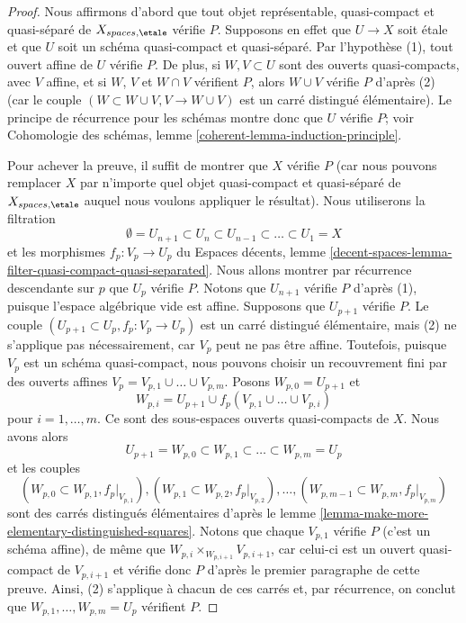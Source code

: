 \begin{proof}
Nous affirmons d'abord que tout objet représentable, quasi-compact et
quasi-séparé de $X_{spaces, \etale}$ v\'erifie $P$.
Supposons en effet que $U \to X$ soit étale et que $U$ soit un schéma
quasi-compact et quasi-séparé. Par l'hypothèse (1), tout ouvert affine de
$U$ v\'erifie $P$. De plus, si $W, V \subset U$ sont des ouverts
quasi-compacts, avec $V$ affine, et si $W$, $V$ et $W \cap V$ v\'erifient
$P$, alors $W \cup V$ v\'erifie $P$ d'après (2)
(car le couple $(W \subset W \cup V, V \to W \cup V)$ est un carré
distingué élémentaire). Le principe de récurrence pour les schémas montre donc
que $U$ v\'erifie $P$; voir
Cohomologie des schémas, lemme \ref{coherent-lemma-induction-principle}.

\medskip\noindent
Pour achever la preuve, il suffit de montrer que $X$ v\'erifie $P$
(car nous pouvons remplacer $X$ par n'importe quel objet quasi-compact et quasi-séparé
de $X_{spaces, \etale}$ auquel nous voulons appliquer le résultat).
Nous utiliserons la filtration
$$
\emptyset = U_{n + 1} \subset
U_n \subset U_{n - 1} \subset \ldots \subset U_1 = X
$$
et les morphismes $f_p : V_p \to U_p$ du
Espaces décents, lemme
\ref{decent-spaces-lemma-filter-quasi-compact-quasi-separated}.
Nous allons montrer par récurrence descendante sur $p$ que $U_p$ v\'erifie
$P$. Notons que $U_{n + 1}$ v\'erifie $P$ d'après (1), puisque l'espace
algébrique vide est affine. Supposons que $U_{p + 1}$ v\'erifie $P$.
Le couple $(U_{p + 1} \subset U_p, f_p : V_p \to U_p)$ est un carré distingué
élémentaire, mais (2) ne s'applique pas nécessairement, car $V_p$ peut ne pas être affine.
Toutefois, puisque $V_p$ est un schéma quasi-compact, nous pouvons choisir un recouvrement
fini par des ouverts affines $V_p = V_{p, 1} \cup \ldots \cup V_{p, m}$.
Posons $W_{p, 0} = U_{p + 1}$ et
$$
W_{p, i} = U_{p + 1} \cup f_p(V_{p, 1} \cup \ldots \cup V_{p, i})
$$
pour $i = 1, \ldots, m$. Ce sont des sous-espaces ouverts quasi-compacts de $X$.
Nous avons alors
$$
U_{p + 1} = W_{p, 0} \subset
W_{p, 1} \subset \ldots \subset
W_{p, m} = U_p
$$
et les couples
$$
(W_{p, 0} \subset W_{p, 1}, f_p|_{V_{p, 1}}),
(W_{p, 1} \subset W_{p, 2}, f_p|_{V_{p, 2}}),\ldots,
(W_{p, m - 1} \subset W_{p, m}, f_p|_{V_{p, m}})
$$
sont des carrés distingués élémentaires d'après le
lemme \ref{lemma-make-more-elementary-distinguished-squares}.
Notons que chaque $V_{p, 1}$ v\'erifie $P$ (c'est un schéma affine), de même
que $W_{p, i} \times_{W_{p, i + 1}} V_{p, i + 1}$, car celui-ci est un ouvert
quasi-compact de $V_{p, i + 1}$ et vérifie donc $P$ d'après le premier
paragraphe de cette preuve. Ainsi, (2) s'applique à chacun de ces carrés et,
par récurrence, on conclut que
$W_{p, 1}, \ldots, W_{p, m} = U_p$ vérifient $P$.
\end{proof}

